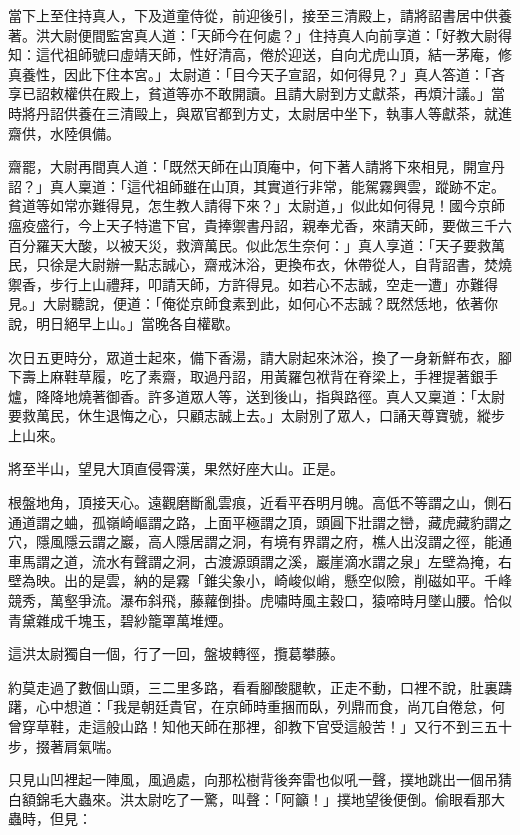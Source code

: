 \documentclass[11pt,a4paper]{article}
\begin{document}
當下上至住持真人，下及道童侍從，前迎後引，接至三清殿上，請將詔書居中供養著。洪大尉便間監宮真人道：「天師今在何處？」住持真人向前享道：「好教大尉得知：這代祖師號曰虛靖天師，性好清高，倦於迎送，自向尤虎山頂，結一茅庵，修真養性，因此下住本宮。」太尉道：「目今天子宣詔，如何得見？」真人答道：「吝享已詔敕權供在殿上，貧道等亦不敢開讀。且請大尉到方丈獻茶，再煩汁議。」當時將丹詔供養在三清毆上，與眾官都到方丈，太尉居中坐下，執事人等獻茶，就進齋供，水陸俱備。

齋罷，大尉再間真人道：「既然天師在山頂庵中，何下著人請將下來相見，開宣丹詔？」真人稟道：「這代祖師雖在山頂，其實道行非常，能駕霧興雲，蹤跡不定。貧道等如常亦難得見，怎生教人請得下來？」太尉道，」似此如何得見！國今京師瘟疫盛行，今上天子特遣下官，貴捧禦書丹詔，親奉尤香，來請天師，要做三千六百分羅天大酸，以被天災，救濟萬民。似此怎生奈何：」真人享道：「天子要救萬民，只徐是大尉辦一點志誠心，齋戒沐浴，更換布衣，休帶從人，自背詔書，焚燒禦香，步行上山禮拜，叩請天師，方許得見。如若心不志誠，空走一遭」亦難得見。」大尉聽說，便道：「俺從京師食素到此，如何心不志誠？既然恁地，依著你說，明日絕早上山。」當晚各自權歇。

次日五更時分，眾道士起來，備下香湯，請大尉起來沐浴，換了一身新鮮布衣，腳下壽上麻鞋草履，吃了素齋，取過丹詔，用黃羅包袱背在脊梁上，手裡提著銀手爐，降降地燒著御香。許多道眾人等，送到後山，指與路徑。真人又稟道：「太尉要救萬民，休生退悔之心，只顧志誠上去。」太尉別了眾人，口誦天尊寶號，縱步上山來。

將至半山，望見大頂直侵霄漢，果然好座大山。正是。

根盤地角，頂接天心。遠觀磨斷亂雲痕，近看平吞明月魄。高低不等謂之山，側石通道謂之蛐，孤嶺崎嶇謂之路，上面平極謂之頂，頭圓下壯謂之巒，藏虎藏豹謂之穴，隱風隱云謂之巖，高人隱居謂之洞，有境有界謂之府，樵人出沒謂之徑，能通車馬謂之道，流水有聲謂之洞，古渡源頭謂之溪，巖崖滴水謂之泉」左壁為掩，右壁為映。出的是雲，納的是霧「錐尖象小，崎峻似峭，懸空似險，削磁如平。千峰競秀，萬壑爭流。瀑布斜飛，藤蘿倒掛。虎嘯時風主穀口，猿啼時月墜山腰。恰似青黛雜成千塊玉，碧紗籠罩萬堆煙。

這洪太尉獨自一個，行了一回，盤坡轉徑，攬葛攀藤。

約莫走過了數個山頭，三二里多路，看看腳酸腿軟，正走不動，口裡不說，肚裏躊躇，心中想道：「我是朝廷貴官，在京師時重捆而臥，列鼎而食，尚兀自倦怠，何曾穿草鞋，走這般山路！知他天師在那裡，卻教下官受這般苦！」又行不到三五十步，掇著肩氣喘。

只見山凹裡起一陣風，風過處，向那松樹背後奔雷也似吼一聲，撲地跳出一個吊猜白額錦毛大蟲來。洪太尉吃了一驚，叫聲：「阿籲！」撲地望後便倒。偷眼看那大蟲時，但見：
\end{document}
